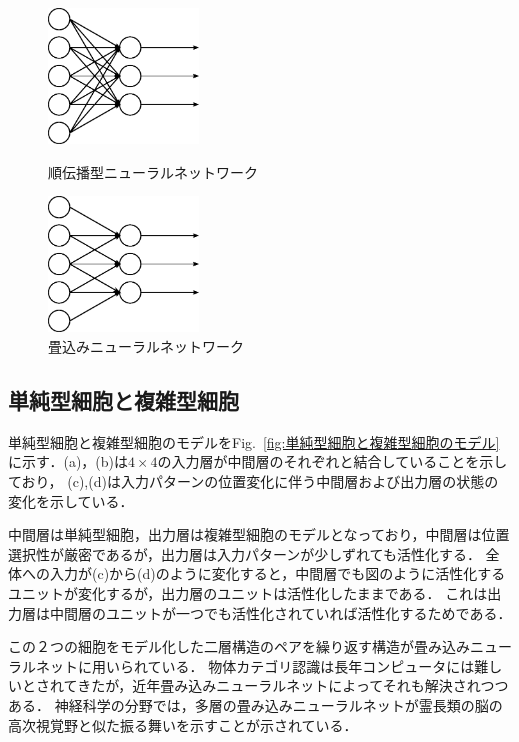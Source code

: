\documentclass[a4paper,10pt]{jsarticle}
\begin{document}
\begin{figure}[htbp]
 \begin{minipage}{0.5\hsize}
  \begin{center}
   \includegraphics[width=40mm]{fig/eps/FNN.eps}
  \end{center}
  \caption{順伝播型ニューラルネットワーク}
  \label{fig:FNN}
 \end{minipage}
 \begin{minipage}{0.5\hsize}
  \begin{center}
   \includegraphics[width=40mm]{fig/eps/CNN.eps}
  \end{center}
  \caption{畳込みニューラルネットワーク}
  \label{fig:CNN}
 \end{minipage}
\end{figure}

\subsection{単純型細胞と複雑型細胞}
単純型細胞と複雑型細胞のモデルをFig.~\ref{fig:単純型細胞と複雑型細胞のモデル}に示す．(a)，(b)は$4\times4$の入力層が中間層のそれぞれと結合していることを示しており，
(c),(d)は入力パターンの位置変化に伴う中間層および出力層の状態の変化を示している．

中間層は単純型細胞，出力層は複雑型細胞のモデルとなっており，中間層は位置選択性が厳密であるが，出力層は入力パターンが少しずれても活性化する．
全体への入力が(c)から(d)のように変化すると，中間層でも図のように活性化するユニットが変化するが，出力層のユニットは活性化したままである．
これは出力層は中間層のユニットが一つでも活性化されていれば活性化するためである．

この２つの細胞をモデル化した二層構造のペアを繰り返す構造が畳み込みニューラルネットに用いられている．
物体カテゴリ認識は長年コンピュータには難しいとされてきたが，近年畳み込みニューラルネットによってそれも解決されつつある．
神経科学の分野では，多層の畳み込みニューラルネットが霊長類の脳の高次視覚野と似た振る舞いを示すことが示されている．
\end{document}
